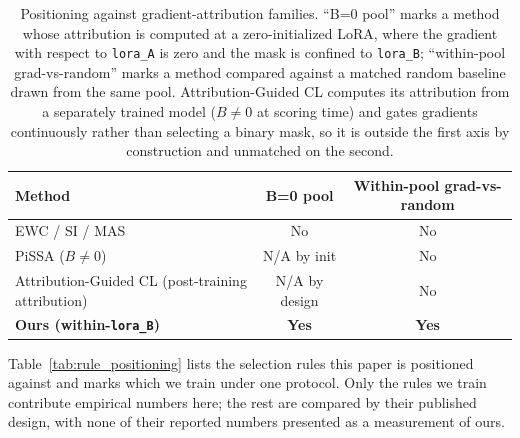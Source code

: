\begin{table}[h]
\centering
\small
\caption{Positioning against gradient-attribution families. ``B=0 pool'' marks a method whose attribution is computed at a zero-initialized LoRA, where the gradient with respect to \texttt{lora\_A} is zero and the mask is confined to \texttt{lora\_B}; ``within-pool grad-vs-random'' marks a method compared against a matched random baseline drawn from the same pool. Attribution-Guided CL computes its attribution from a separately trained model ($B\neq0$ at scoring time) and gates gradients continuously rather than selecting a binary mask, so it is outside the first axis by construction and unmatched on the second.}
\label{tab:positioning}
\begin{tabular}{@{}lcc@{}}
\toprule
\textbf{Method} & \textbf{B=0 pool} & \textbf{Within-pool grad-vs-random} \\
\midrule
EWC / SI / MAS & No & No \\
PiSSA ($B\neq0$) & N/A by init & No \\
Attribution-Guided CL (post-training attribution) & N/A by design & No \\
\textbf{Ours (within-\texttt{lora\_B})} & \textbf{Yes} & \textbf{Yes} \\
\bottomrule
\end{tabular}
\end{table}

Table~\ref{tab:rule_positioning} lists the selection rules this paper is positioned against and marks which we train under one protocol. Only the rules we train contribute empirical numbers here; the rest are compared by their published design, with none of their reported numbers presented as a measurement of ours.

